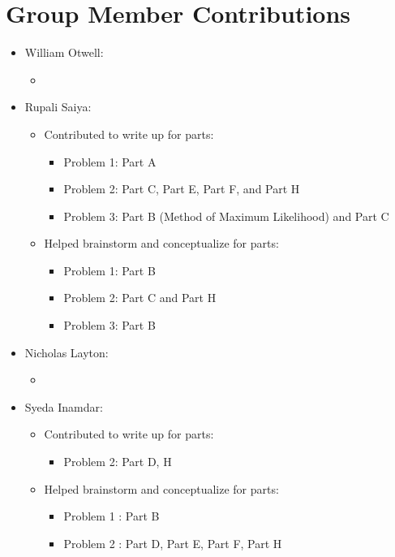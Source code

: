 \documentclass[11pt]{article}
\begin{document}
\section{Group Member Contributions}
\begin{itemize}
	\item William Otwell:
	\begin{itemize}
		\item 
	\end{itemize}
	
	\item Rupali Saiya:
	\begin{itemize}
	\item Contributed to write up for parts:
	\begin{itemize}
		\item Problem 1: Part A
		\item Problem 2: Part C, Part E, Part F, and Part H
		\item Problem 3: Part B (Method of Maximum Likelihood) and Part C

	\end{itemize}
		
	\item Helped brainstorm and conceptualize for parts:
	\begin{itemize}
		\item Problem 1: Part B
		\item Problem 2: Part C and Part H
		\item Problem 3: Part B
	\end{itemize}
	
	\end{itemize}
	
	\item Nicholas Layton:
	\begin{itemize}
		\item 
	\end{itemize}
	
\item Syeda Inamdar:
\begin{itemize}
	\item Contributed to write up for parts:
	\begin{itemize}
		\item Problem 2: Part D, H
	\end{itemize}
	
	\item Helped brainstorm and conceptualize for parts:
	\begin{itemize}
		\item Problem 1 : Part B
		\item Problem 2 : Part D, Part E, Part F,  Part H 
	\end{itemize}
\end{itemize}
	
\pagebreak
\end{itemize}
\end{document}
